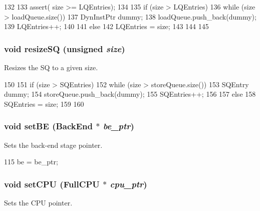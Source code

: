 \begin{DoxyCode}
132 {
133     assert( size >= LQEntries);
134 
135     if (size > LQEntries) {
136         while (size > loadQueue.size()) {
137             DynInstPtr dummy;
138             loadQueue.push_back(dummy);
139             LQEntries++;
140         }
141     } else {
142         LQEntries = size;
143     }
144 
145 }
\end{DoxyCode}
\hypertarget{classOzoneLSQ_a341dd6a3bd8d240659fd9d698c3b5c65}{
\subsubsection[{resizeSQ}]{\setlength{\rightskip}{0pt plus 5cm}void resizeSQ (unsigned {\em size})}}
\label{classOzoneLSQ_a341dd6a3bd8d240659fd9d698c3b5c65}
Resizes the SQ to a given size. 


\begin{DoxyCode}
150 {
151     if (size > SQEntries) {
152         while (size > storeQueue.size()) {
153             SQEntry dummy;
154             storeQueue.push_back(dummy);
155             SQEntries++;
156         }
157     } else {
158         SQEntries = size;
159     }
160 }
\end{DoxyCode}
\hypertarget{classOzoneLSQ_a9134276ed85820d74779ad5826580822}{
\subsubsection[{setBE}]{\setlength{\rightskip}{0pt plus 5cm}void setBE ({\bf BackEnd} $\ast$ {\em be\_\-ptr})}}
\label{classOzoneLSQ_a9134276ed85820d74779ad5826580822}
Sets the back-\/end stage pointer. 


\begin{DoxyCode}
115     { be = be_ptr; }
\end{DoxyCode}
\hypertarget{classOzoneLSQ_ad491c9766121fc19aa77fd0723e7641d}{
\subsubsection[{setCPU}]{\setlength{\rightskip}{0pt plus 5cm}void setCPU ({\bf FullCPU} $\ast$ {\em cpu\_\-ptr})}}
\label{classOzoneLSQ_ad491c9766121fc19aa77fd0723e7641d}
Sets the CPU pointer. 


